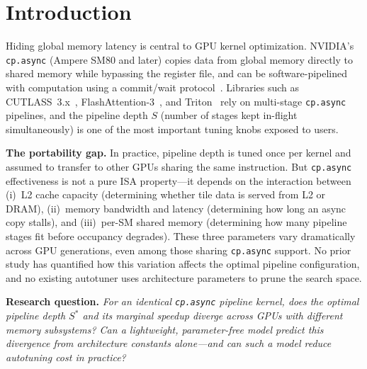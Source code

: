 \documentclass[sigplan,nonacm,10pt]{acmart}
\newcommand{\cpasync}{\texttt{cp.async}}
\begin{document}
\maketitle

\section{Introduction}
\label{sec:intro}

Hiding global memory latency is central to GPU kernel optimization.
NVIDIA's \cpasync{} (Ampere SM80 and later) copies data from global
memory directly to shared memory while bypassing the register file,
and can be software-pipelined with computation using a commit/wait
protocol~\cite{cuda_guide}.
Libraries such as CUTLASS~3.x~\cite{cutlass3}, FlashAttention-3~\cite{flashattn3},
and Triton~\cite{triton} rely on multi-stage \cpasync{} pipelines, and
the pipeline depth $S$ (number of stages kept in-flight simultaneously)
is one of the most important tuning knobs exposed to users.

\textbf{The portability gap.}
In practice, pipeline depth is tuned once per kernel and assumed to
transfer to other GPUs sharing the same instruction.
But \cpasync{} effectiveness is not a pure ISA property---it depends on
the interaction between (i)~L2 cache capacity (determining whether tile
data is served from L2 or DRAM), (ii)~memory bandwidth and latency
(determining how long an async copy stalls), and (iii)~per-SM shared
memory (determining how many pipeline stages fit before occupancy
degrades).
These three parameters vary dramatically across GPU generations, even
among those sharing \cpasync{} support.
No prior study has quantified how this variation affects the optimal
pipeline configuration, and no existing autotuner uses architecture
parameters to prune the search space.

\textbf{Research question.}
\emph{For an identical \cpasync{} pipeline kernel, does the optimal
pipeline depth $S^*$ and its marginal speedup diverge across GPUs with
different memory subsystems?
Can a lightweight, parameter-free model predict this divergence from
architecture constants alone---and can such a model reduce autotuning
cost in practice?}
\end{document}
